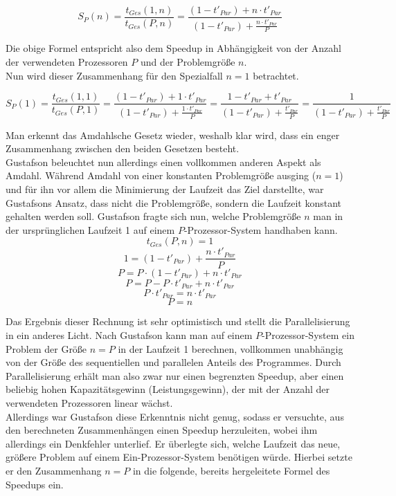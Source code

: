 \begin{description}
					\[ S_P(n) = \frac{t_{Ges}(1, n)}{t_{Ges}(P, n)} = \frac{(1 - t'_{Par}) + n \cdot t'_{Par}}{(1 - t'_{Par}) + \frac{n \cdot t'_{Par}}{P}} \]
					
					Die obige Formel entspricht also dem Speedup in Abhängigkeit von der Anzahl der verwendeten Prozessoren $P$ und der Problemgröße $n$.\\
					Nun wird dieser Zusammenhang für den Spezialfall $n = 1$ betrachtet.
					
					\[ S_P(1) = \frac{t_{Ges}(1, 1)}{t_{Ges}(P, 1)} = \frac{(1 - t'_{Par}) + 1 \cdot t'_{Par}}{(1 - t'_{Par}) + \frac{1 \cdot t'_{Par}}{P}} = \frac{1 - t'_{Par} + t'_{Par}}{(1 - t'_{Par}) + \frac{t'_{Par}}{P}} = \frac{1}{(1 - t'_{Par}) + \frac{t'_{Par}}{P}} \]
					
					Man erkennt das Amdahlsche Gesetz wieder, weshalb klar wird, dass ein enger Zusammenhang zwischen den beiden Gesetzen besteht.\\
					Gustafson beleuchtet nun allerdings einen vollkommen anderen Aspekt als Amdahl. Während Amdahl von einer konstanten Problemgröße ausging ($n = 1$) und für ihn vor allem die Minimierung der Laufzeit das Ziel darstellte, war Gustafsons Ansatz, dass nicht die Problemgröße, sondern die Laufzeit konstant gehalten werden soll. Gustafson fragte sich nun, welche Problemgröße $n$ man in der ursprünglichen Laufzeit 1 auf einem $P$-Prozessor-System handhaben kann.\\
					
					\[ t_{Ges}(P, n) = 1 \]
					\[ 1 = (1 - t'_{Par}) + \frac{n \cdot t'_{Par}}{P} \]
					\[ P = P \cdot (1 - t'_{Par}) + n \cdot t'_{Par} \]
					\[ P = P - P \cdot t'_{Par} + n \cdot t'_{Par} \]
					\[ P \cdot t'_{Par} = n \cdot t'_{Par} \]
					\[ P = n \]
					
					Das Ergebnis dieser Rechnung ist sehr optimistisch und stellt die Parallelisierung in ein anderes Licht. Nach Gustafson kann man auf einem $P$-Prozessor-System ein Problem der Größe $n = P$ in der Laufzeit 1 berechnen, vollkommen unabhängig von der Größe des sequentiellen und parallelen Anteils des Programmes. Durch Parallelisierung erhält man also zwar nur einen begrenzten Speedup, aber einen beliebig hohen Kapazitätsgewinn (Leistungsgewinn), der mit der Anzahl der verwendeten Prozessoren linear wächst.\\
					Allerdings war Gustafson diese Erkenntnis nicht genug, sodass er versuchte, aus den berechneten Zusammenhängen einen Speedup herzuleiten, wobei ihm allerdings ein Denkfehler unterlief. Er überlegte sich, welche Laufzeit das neue, größere Problem auf einem Ein-Prozessor-System benötigen würde. Hierbei setzte er den Zusammenhang $n = P$ in die folgende, bereits hergeleitete Formel des Speedups ein.
					

\end{description}
